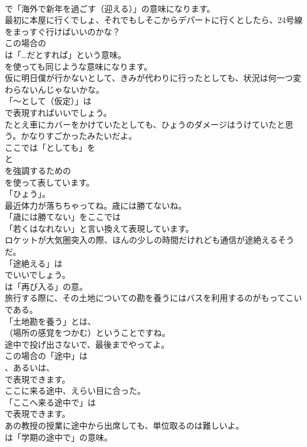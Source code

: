 \documentclass[8pt]{extreport}
\begin{document}
\begin{CJK}{UTF8}{min}
\\	で「海外で新年を過ごす（迎える）」の意味になります。	
\\	最初に本屋に行くでしょ、それでもしそこからデパートに行くとしたら、24号線をまっすぐ行けばいいのかな？ 
\\	この場合の 
\\	は「…だとすれば」という意味。
\\	を使っても同じような意味になります。	
\\	仮に明日僕が行かないとして、きみが代わりに行ったとしても、状況は何一つ変わらないんじゃないかな。 
\\	「～として（仮定）」は 
\\	で表現すればいいでしょう。	
\\	たとえ車にカバーをかけていたとしても、ひょうのダメージはうけていたと思う。かなりすごかったみたいだよ。 
\\	ここでは「としても」を
\\	と
\\	を強調するための
\\	を使って表しています。
\\	「ひょう」。	
\\	最近体力が落ちちゃってね。歳には勝てないね。 
\\	「歳には勝てない」をここでは
\\	「若くはなれない」と言い換えて表現しています。	
\\	ロケットが大気圏突入の際、ほんの少しの時間だけれども通信が途絶えるそうだ。 
\\	「途絶える」は 
\\	でいいでしょう。
\\	は「再び入る」の意。	
\\	旅行する際に、その土地についての勘を養うにはバスを利用するのがもってこいである。 
\\	「土地勘を養う」とは、
\\	（場所の感覚をつかむ）ということですね。	
\\	途中で投げ出さないで、最後までやってよ。 
\\	この場合の「途中」は
\\	、あるいは、
\\	で表現できます。	
\\	ここに来る途中、えらい目に合った。 
\\	「ここへ来る途中で」は
\\	で表現できます。	
\\	あの教授の授業に途中から出席しても、単位取るのは難しいよ。 
\\	は「学期の途中で」の意味。

\end{CJK}
\end{document}
